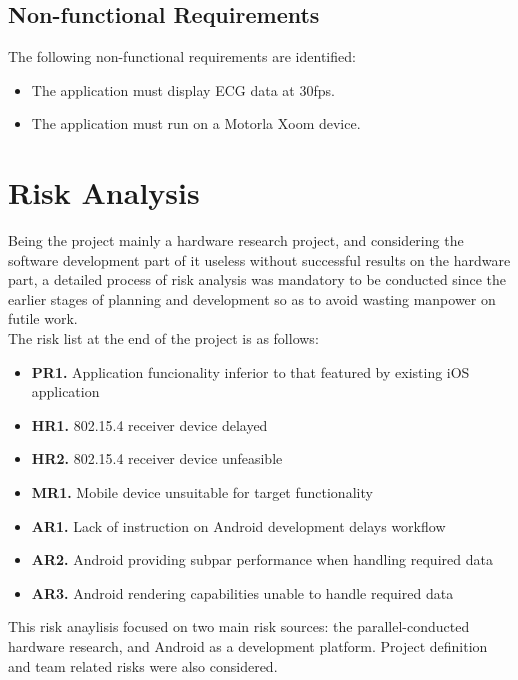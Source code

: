
		\subsection{Non-functional Requirements}

		The following non-functional requirements are identified:
		\begin{itemize}
			\item The application must display ECG data at 30fps.
			\item The application must run on a Motorla Xoom device.
		\end{itemize}

	\section{Risk Analysis}
	\label{sec:sw-risks}

		Being the project mainly a hardware research project, and considering the software development part of it useless without successful results on the hardware part, a detailed process of risk analysis was mandatory to be conducted since the earlier stages of planning and development so as to avoid wasting manpower on futile work.\\

		The risk list at the end of the project is as follows:
		\begin{itemize}
		\item \textbf{PR1.} Application funcionality inferior to that featured by existing iOS application

		\item \textbf{HR1.} 802.15.4 receiver device delayed
		\item \textbf{HR2.} 802.15.4 receiver device unfeasible

		\item \textbf{MR1.} Mobile device unsuitable for target functionality

		\item \textbf{AR1.} Lack of instruction on Android development delays workflow
		\item \textbf{AR2.} Android providing subpar performance when handling required data
		\item \textbf{AR3.} Android rendering capabilities unable to handle required data
		\end{itemize}

		This risk anaylisis focused on two main risk sources: the parallel-conducted hardware research, and Android as a development platform. Project definition and team related risks were also considered.\\

